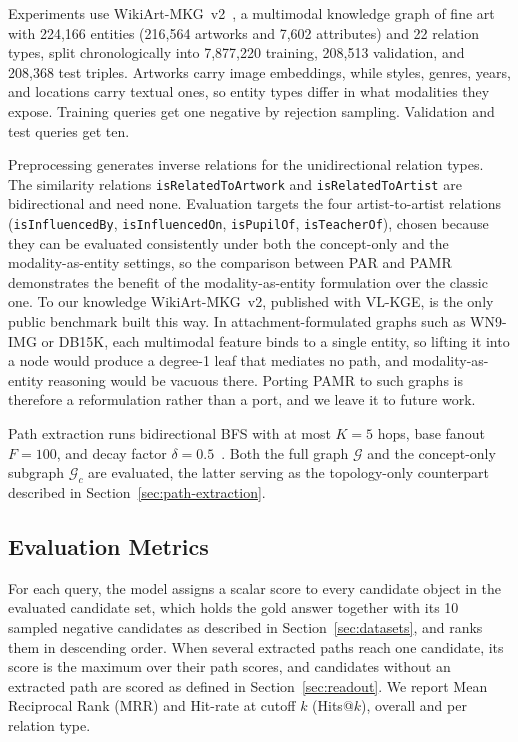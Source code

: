 \documentclass[runningheads]{llncs}
\begin{document}
Experiments use WikiArt-MKG~v2~\cite{efthymiou2026vlkge}, a multimodal
knowledge graph of fine art with 224,166 entities (216,564 artworks and
7,602 attributes) and 22 relation types, split chronologically into
7,877,220 training, 208,513 validation, and 208,368 test triples.
Artworks carry image embeddings, while styles, genres, years, and locations
carry textual ones, so entity types differ in what modalities they
expose. Training queries get one negative by rejection sampling.
Validation and test queries get ten.

Preprocessing generates inverse
relations for the unidirectional relation types. The similarity
relations \texttt{isRelatedToArtwork} and \texttt{isRelatedToArtist} are
bidirectional and need none. Evaluation targets the four artist-to-artist
relations (\texttt{isInfluencedBy},
\texttt{isInfluencedOn}, \texttt{isPupilOf}, \texttt{isTeacherOf}),
chosen because they can be evaluated consistently under both the
concept-only and the modality-as-entity settings, so the comparison
between PAR and PAMR demonstrates the benefit of the modality-as-entity
formulation over the classic one. To our knowledge WikiArt-MKG~v2,
published with VL-KGE, is the only public benchmark built this way. In
attachment-formulated graphs such as WN9-IMG or DB15K, each multimodal
feature binds to a single entity, so lifting it into a node would
produce a degree-1 leaf that mediates no path, and modality-as-entity
reasoning would be vacuous there. Porting PAMR to such graphs is
therefore a reformulation rather than a port, and we leave it to
future work.

Path extraction runs bidirectional BFS with at most $K = 5$ hops, base
fanout $F = 100$, and decay factor $\delta = 0.5$~\cite{icaart26}. Both
the full graph $\mathcal{G}$ and the concept-only subgraph $\mathcal{G}_c$
are evaluated, the latter serving as the topology-only
counterpart described in Section~\ref{sec:path-extraction}.

\subsection{Evaluation Metrics}
\label{sec:evaluation-metrics}

For each query, the model assigns a scalar score to every candidate
object in the evaluated candidate set, which holds the gold answer
together with its 10 sampled negative candidates as described in
Section~\ref{sec:datasets}, and ranks them in descending order. When
several extracted paths reach one candidate, its score is the maximum
over their path scores, and candidates without an extracted path are
scored as defined in Section~\ref{sec:readout}. We
report Mean Reciprocal Rank (MRR) and Hit-rate at cutoff $k$
(Hits@$k$), overall and per relation type.
\end{document}
